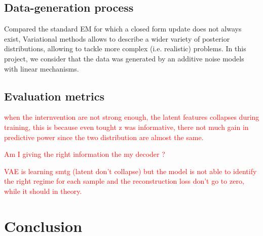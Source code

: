 \documentclass{article}
\newcommand\todo[1]{\textcolor{red}{#1}}
\begin{document}
\subsection{Data-generation process}
Compared the standard EM for which a closed form update does not always exist, Variational methods allows to describe a wider variety of posterior distributions, allowing to tackle more complex (i.e. realistic) problems. In this project, we consider that the data was generated by an additive noise models with linear mechanisms.

\subsection{Evaluation metrics}
\todo{when the internvention are not strong enough, the latent features collapses during training, this is because even tought z was informative, there not much gain in predictive power since the two distribution are almost the same.}

\todo{Am I giving the right information the my decoder ?}

\todo{VAE is learning smtg (latent don't collapse) but the model is not able to identify the right regime for each sample and the reconstruction loss don't go to zero, while it should in theory.}

\section{Conclusion}\label{subsec:Conclusion}

\cite{mahajan_zero-shot_2024}



\end{document}
